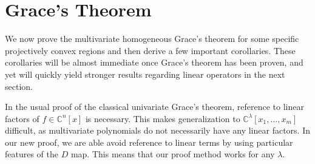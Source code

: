 \documentclass{article}
\theoremstyle{definition}
\theoremstyle{plain}
\newcommand{\C}{\mathbb{C}}
\begin{document}
\section{Grace's Theorem}\label{graces_sect}

We now prove the multivariate homogeneous Grace's theorem for some specific projectively convex regions and then derive a few important corollaries. These corollaries will be almost immediate once Grace's theorem has been proven, and yet will quickly yield stronger results regarding linear operators in the next section.

In the usual proof of the classical univariate Grace's theorem, reference to linear factors of $f \in \C^n[x]$ is necessary. This makes generalization to $\C^\lambda[x_1,\ldots,x_m]$ difficult, as multivariate polynomials do not necessarily have any linear factors. In our new proof, we are able avoid reference to linear terms by using particular features of the $D$ map. This means that our proof method works for any $\lambda$.
\end{document}
